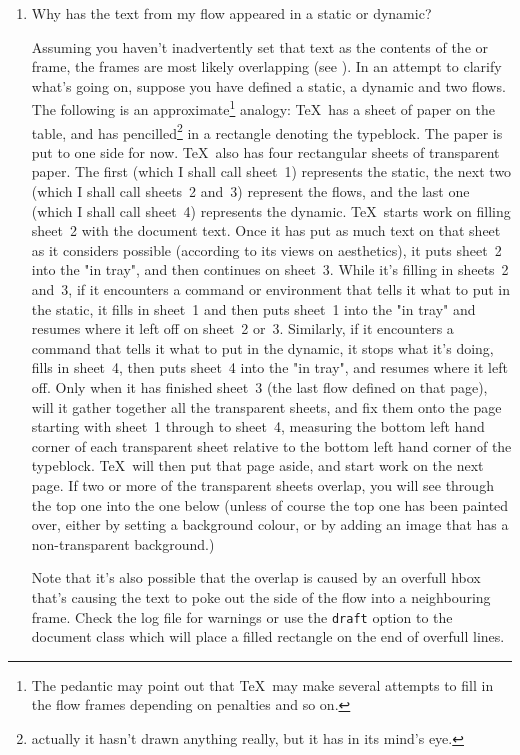 \documentclass[a4paper,twoside]{book}
\newcommand{\pkgoptni}[1]{\textsf{#1}}
\newcommand{\dq}[1]{``#1''}
\renewcommand{\TeX}{TeX}
\renewcommand{\pkgoptni}[1]{\texttt{#1}}
\renewcommand{\dq}[1]{"#1"}
\newcommand*{\staticordynamic}{\glslink{static}{static} or 
\glslink{dynamic}{dynamic} frame}
\newcounter{N}
\newcounter{I}
\begin{document}
\begin{enumerate}
\item Why has the text from my \gls{flow} appeared in a
\gls{static} or \gls{dynamic}?

Assuming you haven't inadvertently set that text as the contents
of the \staticordynamic, the frames are most likely 
overlapping (see ).
In an attempt to clarify what's going on, suppose you have 
defined a \gls{static}, a \gls{dynamic} and two \glspl{flow}. The 
following is an approximate\footnote{The pedantic may point out 
that \TeX\ may make several attempts to fill in the flow frames 
depending on penalties and so on.} analogy: \TeX\ has a sheet of 
paper on the table, and has pencilled\footnote{actually it hasn't
drawn anything really, but it has in its mind's eye.} in a 
rectangle denoting the \gls{typeblock}.  The paper is put to one 
side for now.  \TeX\ also has four rectangular sheets
of transparent paper. The first (which I shall call sheet~1)
represents the \gls{static}, the next two (which I shall call
sheets~2 and~3) represent the \glspl{flow}, and the last one
(which I shall call sheet~4) represents the \gls{dynamic}.
\TeX\ starts work on filling sheet~2 with the document text.
Once it has put as much text on that sheet as it considers 
possible (according to its views on aesthetics), it puts sheet~2
into the \dq{in tray}, and then continues on sheet~3. While it's
filling in sheets~2 and~3, if it encounters a command or 
environment that tells it what to put in the \gls{static}, 
it fills in sheet~1 and then puts sheet~1 into the \dq{in tray} and
resumes where it left off on sheet~2 or~3. Similarly, if
it encounters a command that tells it what to put in the
\gls{dynamic}, it stops what it's doing, fills in sheet~4, then
puts sheet~4 into the \dq{in tray}, and resumes where it left off.
Only when it has finished sheet~3 (the last \gls{flow} defined
on that page), will it gather together all
the transparent sheets, and fix them onto the page starting
with sheet~1 through to sheet~4, measuring the bottom left hand 
corner of each transparent sheet relative to the bottom left hand 
corner of the \gls{typeblock}.  \TeX\ will then put that page 
aside, and start work on the next page. If two or more of the
transparent sheets overlap, you will see through the top one into
the one below (unless of course the top one has been painted
over, either by setting a background colour, or by adding an
image that has a non-transparent background.)

Note that it's also possible that the overlap is caused by an 
overfull hbox that's causing the text to poke out the side of the 
\gls{flow} into a neighbouring \gls{frame}. Check the log file for
warnings or use the \pkgoptni{draft} option to the document class
which will place a filled rectangle on the end of overfull lines.


\end{enumerate}
\end{document}
